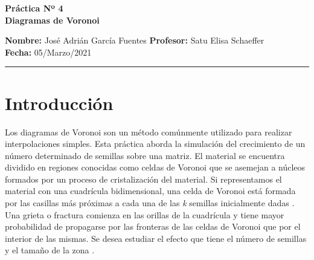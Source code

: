 \documentclass[a4paper]{article}
\begin{document}
\begin{center} %
\large \bf Práctica Nº 4   %
\\ %
Diagramas de Voronoi
\end{center} %
\textbf{Nombre:}   %
José Adrián García Fuentes
\hfill  %
\textbf{Profesor:}   %
Satu Elisa Schaeffer \hfill
\\
\textbf{Fecha:} 05/Marzo/2021        %
\\
\hrule    %
\medskip
 \section{Introducción}
\justify Los diagramas de Voronoi son un método comúnmente utilizado para realizar interpolaciones simples. Esta práctica aborda la simulación del crecimiento de un número determinado de semillas sobre una matriz. El material se encuentra dividido en regiones conocidas como celdas de Voronoi que se asemejan a núcleos formados por un proceso de cristalización del material. Si representamos el material con una cuadrícula bidimensional, una celda de Voronoi está formada por las casillas más próximas a cada una de las \textit{k} semillas inicialmente dadas \cite{1}. Una grieta o fractura comienza en las orillas de la cuadrícula y tiene mayor probabilidad de propagarse por las fronteras de las celdas de Voronoi que por el interior de las mismas. Se desea estudiar el efecto que tiene el número de semillas y el tamaño de la zona  \cite{p3}.
\end{document}
